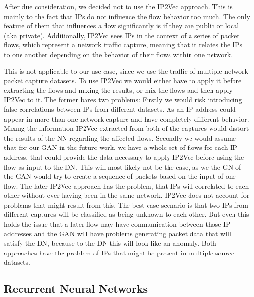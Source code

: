 \documentclass[
	ngerman,
	ruledheaders=section,%
	class=report,%
	thesis={type=bachelor},%
	accentcolor=9c,%
	custommargins=true,%
	marginpar=false,%
	parskip=half-,%
	fontsize=11pt,%
]{tudapub}
\begin{document}


After due consideration, we decided not to use the IP2Vec approach.
This is mainly to the fact that IPs do not influence the flow behavior too much.
The only feature of them that influences a flow significantly is if they are public or local (aka private).
Additionally, IP2Vec sees IPs in the context of a series of packet flows, which represent a network traffic capture,
meaning that it relates the IPs to one another depending on the behavior of their flows within one network.

This is not applicable to our use case, since we use the traffic of multiple network packet capture datasets.
To use IP2Vec we would either have to apply it before extracting the flows and mixing the results,
or mix the flows and then apply IP2Vec to it.
The former bares two problems:
Firstly we would risk introducing false correlations between IPs from different datasets.
As an IP address could appear in more than one network capture and have completely different behavior.
Mixing the information IP2Vec extracted from both of the captures would distort the results of the NN regarding the affected flows.
Secondly we would assume that for our GAN in the future work, we have a whole set of flows for each IP address, that could provide the data necessary to apply IP2Vec before using the flow as input to the DN.
This will most likely not be the case, as we the GN of the GAN would try to create a sequence of packets based on the input of one flow.
The later IP2Vec approach has the problem, that IPs will correlated to each other without ever having been in the same network.
IP2Vec does not account for problems that might result from this.
The best-case scenario is that two IPs from different captures will be classified as being unknown to each other.
But even this holds the issue that a later flow may have communication between those IP addresses and the GAN will have problems generating packet data that will satisfy the DN, because to the DN this will look like an anomaly.
Both approaches have the problem of IPs that might be present in multiple source datasets.

\subsection{Recurrent Neural Networks}
\end{document}
